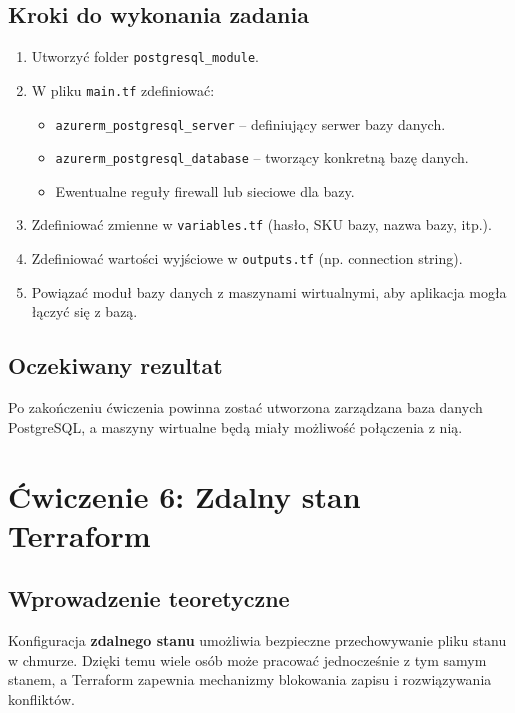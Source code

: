 \documentclass{article}
\begin{document}
\subsection{Kroki do wykonania zadania}
\begin{enumerate}
    \item Utworzyć folder \texttt{postgresql\_module}.
    \item W pliku \texttt{main.tf} zdefiniować:
    \begin{itemize}
        \item \texttt{azurerm\_postgresql\_server} – definiujący serwer bazy danych.
        \item \texttt{azurerm\_postgresql\_database} – tworzący konkretną bazę danych.
        \item Ewentualne reguły firewall lub sieciowe dla bazy.
    \end{itemize}
    \item Zdefiniować zmienne w \texttt{variables.tf} (hasło, SKU bazy, nazwa bazy, itp.).
    \item Zdefiniować wartości wyjściowe w \texttt{outputs.tf} (np. connection string).
    \item Powiązać moduł bazy danych z maszynami wirtualnymi, aby aplikacja mogła łączyć się z bazą.
\end{enumerate}

\subsection{Oczekiwany rezultat}
Po zakończeniu ćwiczenia powinna zostać utworzona zarządzana baza danych PostgreSQL, a maszyny wirtualne będą miały możliwość połączenia z nią. 

\section{Ćwiczenie 6: Zdalny stan Terraform}

\subsection{Wprowadzenie teoretyczne}
Konfiguracja \textbf{zdalnego stanu} umożliwia bezpieczne przechowywanie pliku stanu w chmurze. Dzięki temu wiele osób może pracować jednocześnie z tym samym stanem, a Terraform zapewnia mechanizmy blokowania zapisu i rozwiązywania konfliktów.
\end{document}
